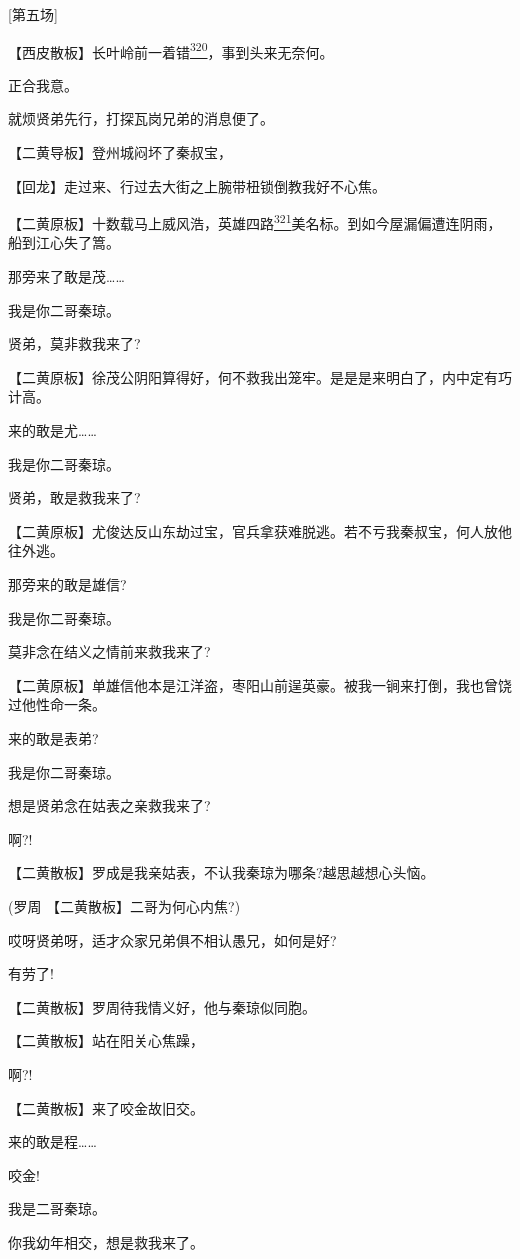 {[}第五场{]}

【西皮散板】长叶岭前一着错\protect\hyperlink{fn320}{\textsuperscript{320}}，事到头来无奈何。

正合我意。

就烦贤弟先行，打探瓦岗兄弟的消息便了。

【二黄导板】登州城闷坏了秦叔宝，

【回龙】走过来、行过去大街之上腕带杻锁倒教我好不心焦。

【二黄原板】十数载马上威风浩，英雄四路\protect\hyperlink{fn321}{\textsuperscript{321}}美名标。到如今屋漏偏遭连阴雨，船到江心失了篙。

那旁来了敢是茂\ldots{}\ldots{}

我是你二哥秦琼。

贤弟，莫非救我来了?

【二黄原板】徐茂公阴阳算得好，何不救我出笼牢。是是是来明白了，内中定有巧计高。

来的敢是尤\ldots{}\ldots{}

我是你二哥秦琼。

贤弟，敢是救我来了?

【二黄原板】尤俊达反山东劫过宝，官兵拿获难脱逃。若不亏我秦叔宝，何人放他往外逃。

那旁来的敢是雄信?

我是你二哥秦琼。

莫非念在结义之情前来救我来了?

【二黄原板】单雄信他本是江洋盗，枣阳山前逞英豪。被我一锏来打倒，我也曾饶过他性命一条。

来的敢是表弟?

我是你二哥秦琼。

想是贤弟念在姑表之亲救我来了?

啊?!

【二黄散板】罗成是我亲姑表，不认我秦琼为哪条?越思越想心头恼。

(罗周 【二黄散板】二哥为何心内焦?)

哎呀贤弟呀，适才众家兄弟俱不相认愚兄，如何是好?

有劳了!

【二黄散板】罗周待我情义好，他与秦琼似同胞。

【二黄散板】站在阳关心焦躁，

啊?!

【二黄散板】来了咬金故旧交。

来的敢是程\ldots{}\ldots{}

咬金!

我是二哥秦琼。

你我幼年相交，想是救我来了。

